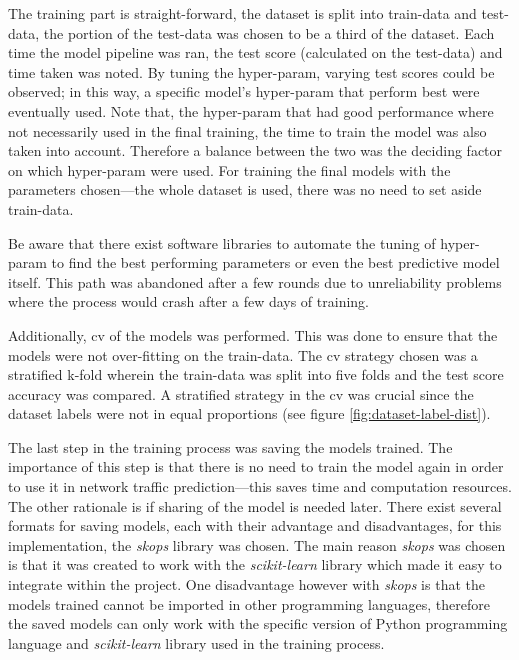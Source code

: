 The training part is straight-forward, the dataset is split into \gls{train-data} and \gls{test-data},
the portion of the \gls{test-data} was chosen to be a third of the dataset.
Each time the model pipeline was ran, the test score (calculated on the \gls{test-data}) and time taken was noted.
By tuning the \gls{hyper-param}, varying test scores could be observed;
in this way, a specific model's \gls{hyper-param} that perform best were eventually used.
Note that, the \gls{hyper-param} that had good performance where not necessarily used in the final training,
the time to train the model was also taken into account.
Therefore a balance between the two was the deciding factor on which \gls{hyper-param} were used.
For training the final models with the parameters chosen---the whole dataset is used, there was no need to set aside \gls{train-data}.

Be aware that there exist software libraries to automate the tuning of \gls{hyper-param} to find the best performing parameters or even the best predictive model itself.
This path was abandoned after a few rounds due to unreliability problems where the process would crash after a few days of training.

Additionally, \gls{cv} of the models was performed.
This was done to ensure that the models were not \gls{over-fitting} on the \gls{train-data}.
The \gls{cv} strategy chosen was a stratified k-fold wherein the \gls{train-data} was split into five folds and
the test score accuracy was compared.
A stratified strategy in the \gls{cv} was crucial since the dataset labels were not in equal proportions (see figure \ref{fig:dataset-label-dist}).

\clearpage
The last step in the training process was saving the models trained.
The importance of this step is that there is no need to train the model again in order to use it in network traffic prediction---this saves time and computation resources.
The other rationale is if sharing of the model is needed later.
There exist several formats for saving models, each with their advantage and disadvantages, for this implementation, the \emph{skops} library was chosen.
The main reason \emph{skops} was chosen is that it was created to work with the \emph{scikit-learn} library which made it easy to integrate within the project.
One disadvantage however with \emph{skops} is that the models trained cannot be imported in other programming languages,
therefore the saved models can only work with the specific version of Python programming language and \emph{scikit-learn} library used in the training process.

